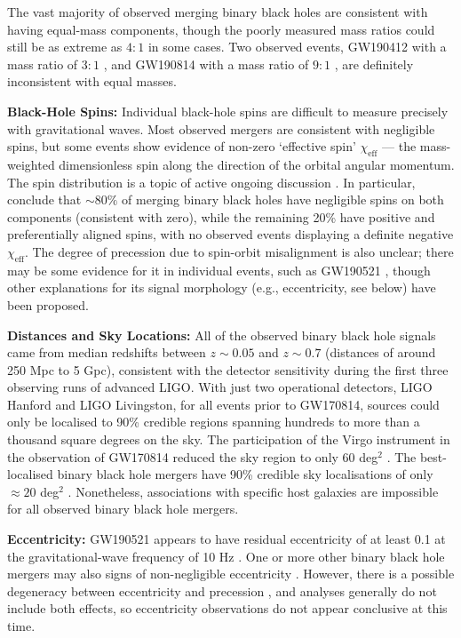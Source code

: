 \documentclass[review]{elsarticle}
\begin{document}
The vast majority of observed merging binary black holes are consistent with having equal-mass components, though the poorly measured mass ratios could still be as extreme as $4:1$ in some cases.  Two observed events, GW190412 with a mass ratio of $3:1$ \citep{GW190412}, and GW190814 with a mass ratio of $9:1$ \citep{GW190814}, are definitely inconsistent with equal masses.  

\textbf{Black-Hole Spins:} Individual black-hole spins are difficult to measure precisely with gravitational waves.  Most observed mergers are consistent with negligible spins, but some events show evidence of non-zero `effective spin' $\chi_\textrm{eff}$ --- the mass-weighted dimensionless spin along the direction of the orbital angular momentum.  The spin distribution is a topic of active ongoing discussion \citep[e.g.,][]{GWTC2:pop,Roulet:2021,Callister:2021,Galaudage:2021}.  In particular, \citet{Galaudage:2021} conclude that $\sim 80\%$ of merging binary black holes have negligible spins on both components (consistent with zero), while the remaining 20\% have positive and preferentially aligned spins, with no observed events displaying a definite negative $\chi_\textrm{eff}$.  The degree of precession due to spin-orbit misalignment is also unclear; there may be some evidence for it in individual events, such as GW190521 \citep{GW190521}, though other explanations for its signal morphology (e.g., eccentricity, see below) have been proposed.

\textbf{Distances and Sky Locations:} All of the observed binary black hole signals came from median redshifts between $z\sim 0.05$ and $z \sim 0.7$ (distances of around 250 Mpc to 5 Gpc), consistent with the detector sensitivity during the first three observing runs of advanced LIGO.  With just two operational detectors, LIGO Hanford and LIGO Livingston, for all events prior to GW170814, sources could only be localised to 90\% credible regions spanning hundreds to more than a thousand square degrees on the sky.  The participation of the Virgo instrument in the observation of GW170814 reduced the sky region to only 60 deg$^2$ \citep{GW170814}.   The best-localised binary black hole mergers have 90\% credible sky localisations of only $\approx 20$ deg$^2$ \citep{GWTC2}.  Nonetheless, associations with specific host galaxies are impossible for all observed binary black hole mergers.  

\textbf{Eccentricity:}  GW190521 appears to have residual eccentricity of at least 0.1 at the gravitational-wave frequency of 10 Hz \citep{RomeroShaw:2020GW190521}.  One or more other binary black hole mergers may also signs of non-negligible eccentricity \citep{RomeroShaw:2021}.  However, there is a possible degeneracy between eccentricity and precession \citep{Bustillo:2021}, and analyses generally do not include both effects, so eccentricity observations do not appear conclusive at this time.
\end{document}
